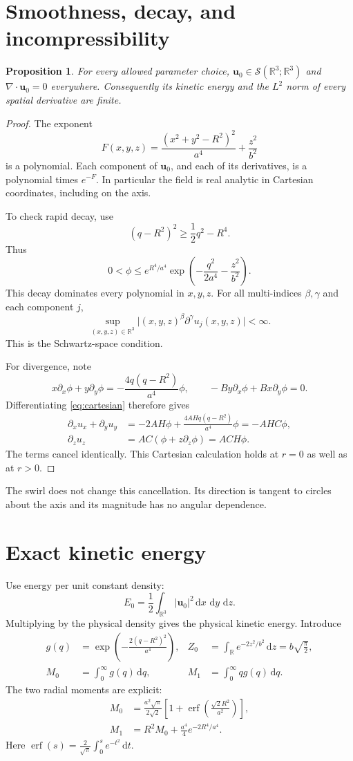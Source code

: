 \documentclass[11pt]{article}
\newtheorem{proposition}{Proposition}
\newcommand{\R}{\mathbb R}
\newcommand{\uu}{\mathbf u_0}
\newcommand{\dd}{\,\mathrm d}
\begin{document}
\section{Smoothness, decay, and incompressibility}

\begin{proposition}
For every allowed parameter choice, $\uu\in\mathcal S(\R^3;\R^3)$ and
$\nabla\cdot\uu=0$ everywhere. Consequently its kinetic energy and the
$L^2$ norm of every spatial derivative are finite.
\end{proposition}

\begin{proof}
The exponent
\[
F(x,y,z)=\frac{(x^2+y^2-R^2)^2}{a^4}+\frac{z^2}{b^2}
\]
is a polynomial. Each component of $\uu$, and each of its derivatives, is a
polynomial times $e^{-F}$. In particular the field is real analytic in
Cartesian coordinates, including on the axis.

To check rapid decay, use
\[
(q-R^2)^2\geq\frac12q^2-R^4.
\]
Thus
\[
0<\phi\leq e^{R^4/a^4}
\exp\!\left(-\frac{q^2}{2a^4}-\frac{z^2}{b^2}\right).
\]
This decay dominates every polynomial in $x,y,z$. For all multi-indices
$\beta,\gamma$ and each component $j$,
\[
\sup_{(x,y,z)\in\R^3}
\big| (x,y,z)^\beta\partial^\gamma u_j(x,y,z)\big|<\infty.
\]
This is the Schwartz-space condition.

For divergence, note
\[
x\partial_x\phi+y\partial_y\phi
=-\frac{4q(q-R^2)}{a^4}\phi,\qquad
-By\partial_x\phi+Bx\partial_y\phi=0.
\]
Differentiating \eqref{eq:cartesian} therefore gives
\begin{align*}
\partial_xu_x+\partial_yu_y
&=-2AH\phi+\frac{4AHq(q-R^2)}{a^4}\phi=-AHC\phi,\\
\partial_zu_z
&=AC(\phi+z\partial_z\phi)=ACH\phi.
\end{align*}
The terms cancel identically. This Cartesian calculation holds at $r=0$
as well as at $r>0$.
\end{proof}

The swirl does not change this cancellation. Its direction is tangent to
circles about the axis and its magnitude has no angular dependence.

\section{Exact kinetic energy}

Use energy per unit constant density:
\[
E_0=\frac12\int_{\R^3}|\uu|^2\dd x\,\dd y\,\dd z.
\]
Multiplying by the physical density gives the physical kinetic energy.
Introduce
\begin{align*}
g(q)&=\exp\!\left(-\frac{2(q-R^2)^2}{a^4}\right),&
Z_0&=\int_{\R}e^{-2z^2/b^2}\dd z=b\sqrt{\frac{\pi}{2}},\\
M_0&=\int_0^\infty g(q)\dd q,&
M_1&=\int_0^\infty qg(q)\dd q.
\end{align*}
The two radial moments are explicit:
\begin{align}
M_0&=\frac{a^2\sqrt\pi}{2\sqrt2}
\left[1+\operatorname{erf}\!\left(\frac{\sqrt2 R^2}{a^2}\right)\right],\\
M_1&=R^2M_0+\frac{a^4}{4}e^{-2R^4/a^4}.
\end{align}
Here $\operatorname{erf}(s)=\frac{2}{\sqrt\pi}\int_0^s e^{-t^2}\dd t$.
\end{document}
